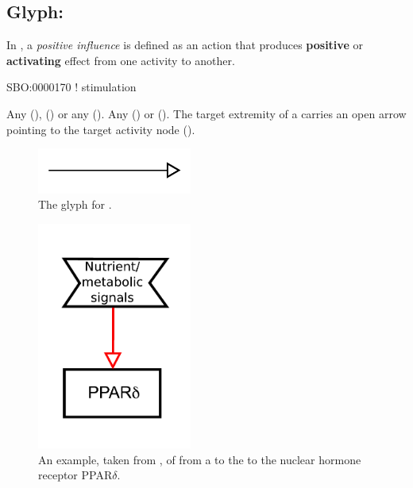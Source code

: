 \subsection{Glyph: }
\label{sec:af:positive_infl}

In \SBGNAFLone, a \emph{positive influence} is defined as an action that produces \textbf{positive} or \textbf{activating} effect from one activity to another.

\begin{glyphDescription}

\glyphSboTerm SBO:0000170 ! stimulation

 \glyphOrigin Any  (),   () or any  ().
 \glyphTarget Any  () or  ().
 \glyphEndPoint The target extremity of a  carries an open arrow pointing to the target activity node ().

\end{glyphDescription}

\begin{figure}[H]
  \centering
  \includegraphics[width = 2in]{images/positiveInfluence}
  \caption{The \AF glyph for .}
  \label{fig:af:positiveInfl}
\end{figure}

\begin{figure}[H]
  \centering
  \includegraphics[width = 2in]{examples/ex-positiveInfluence}
  \caption{An example, taken from , of  from a  to the to the nuclear hormone receptor PPAR$\delta$.}
  \label{fig:af:exPI}
\end{figure} 
